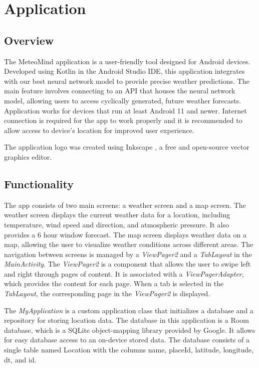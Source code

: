 \chapter{Application}

\section{Overview}
The MeteoMind application is a user-friendly tool designed for Android devices. Developed using Kotlin in the Android Studio IDE, this application integrates with our best neural network model to provide precise weather predictions. The main feature involves connecting to an API that houses the neural network model, allowing users to access cyclically generated, future weather forecasts. Application works for devices that run at least Android 11 and newer. Internet connection is required for the app to work properly and it is recommended to allow access to device's location for improved user experience. 

The application logo was created using Inkscape \cite{inkscape}, a free and open-source vector graphics editor.



\section{Functionality}

The app consists of two main screens: a weather screen and a map screen. The weather screen displays the current weather data for a location, including temperature, wind speed and direction, and atmospheric pressure. It also provides a 6 hour window forecast. The map screen displays weather data on a map, allowing the user to visualize weather conditions across different areas. The navigation between screens is managed by a \textit{ViewPager2} and a \textit{TabLayout} in the \textit{MainActivity}. The \textit{ViewPager2} is a component that allows the user to swipe left and right through pages of content. It is associated with a \textit{ViewPagerAdapter}, which provides the content for each page. When a tab is selected in the \textit{TabLayout}, the corresponding page in the \textit{ViewPager2} is displayed.

 The \textit{MyApplication} is a custom application class that initializes a database and a repository for storing location data. The database in this application is a Room database, which is a SQLite object-mapping library provided by Google. It allows for easy database access to an on-device stored data. The database consists of a single table named Location with the columns name, placeId, latitude, longitude, dt, and id.

